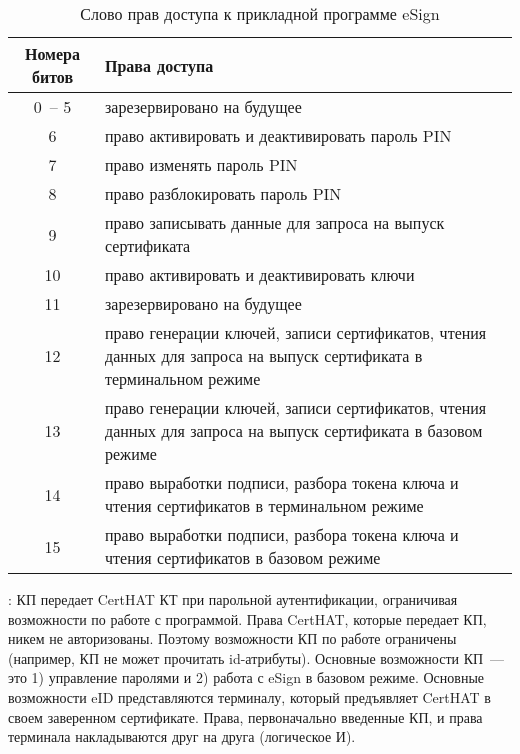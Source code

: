 \begin{table}[H]
\caption{Слово прав доступа к прикладной программе eSign}
\label{Table.DATA.SMTAccess}
\begin{tabular}{|c|p{13.5cm}|}
\hline
Номера битов & Права доступа\\
\hline
\hline
0~-- 5 &  
зарезервировано на будущее\\ 
%
\hline 
6 &
право активировать и деактивировать пароль PIN\\ 
%
\hline 
7 &
право изменять пароль PIN\\ 
%
\hline 
8 &
право разблокировать пароль PIN\\ 
%
\hline 
9 &
право записывать данные для запроса на выпуск сертификата\\ 
%
\hline 
10 &
право активировать и деактивировать ключи\\ 
%
\hline 
11 &
зарезервировано на будущее\\ 
%
\hline 
12 &
право генерации ключей, записи сертификатов, 
чтения данных для запроса на выпуск сертификата
в терминальном режиме\\ 
%
\hline 
13 &
право генерации ключей, записи сертификатов, 
чтения данных для запроса на выпуск сертификата
в базовом режиме\\ 
%
\hline 
14 &
право выработки подписи, разбора токена ключа и чтения сертификатов 
в терминальном режиме\\ 
%
\hline 
15 &
право выработки подписи, разбора токена ключа и чтения сертификатов 
в базовом режиме\\ 
\hline 
\end{tabular}
\end{table}


: КП передает CertHAT КТ при парольной аутентификации,
ограничивая возможности по работе с программой. Права CertHAT, которые передает КП, 
никем не авторизованы. Поэтому возможности КП по работе ограничены
(например, КП не может прочитать id-атрибуты). Основные возможности КП~---
это 1) управление паролями и 2) работа с eSign в базовом режиме.
%
Основные возможности eID представляются терминалу, который предъявляет CertHAT 
в своем заверенном сертификате. Права, первоначально введенные КП, 
и права терминала накладываются друг на друга (логическое И). 
\fi
